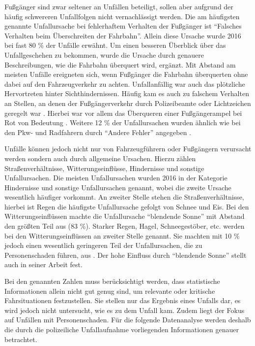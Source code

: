 Fußgänger sind zwar seltener an Unfällen beteiligt, sollen aber aufgrund der häufig schwereren Unfallfolgen nicht vernachlässigt werden. Die am häufigsten genannte Unfallursache bei fehlerhaftem Verhalten der Fußgänger ist \enquote{Falsches Verhalten beim Überschreiten der Fahrbahn}. Allein diese Ursache wurde 2016 bei fast 80 \% der Unfälle erwähnt. Um einen besseren Überblick über das Unfallgeschehen zu bekommen, wurde die Ursache durch genauere Beschreibungen, wie die Fahrbahn überquert wird, ergänzt. Mit Abstand am meisten Unfälle ereigneten sich, wenn Fußgänger die Fahrbahn überquerten ohne dabei auf den Fahrzeugverkehr zu achten. Unfallanfällig war auch das plötzliche Hervortreten hinter Sichthindernissen. Häufig kam es auch zu falschem Verhalten an Stellen, an denen der Fußgängerverkehr durch Polizeibeamte oder Lichtzeichen geregelt war \parencite[S. 304]{StatistischesBundesamt.2018b}. Hierbei war vor allem das Überqueren einer Fußgängerampel bei Rot von Bedeutung \parencite[S. 222]{Schreiber.2014}.
Weitere 12 \% der Unfallursachen wurden ähnlich wie bei den Pkw- und Radfahrern durch \enquote{Andere Fehler} angegeben \parencite[S. 304]{StatistischesBundesamt.2018b}.

Unfälle können jedoch nicht nur von Fahrzeugführern oder Fußgängern verursacht werden sondern auch durch allgemeine Ursachen. Hierzu zählen Straßenverhältnisse, Witterungseinflüsse, Hindernisse und sonstige Unfallursachen. Die meisten Unfallursachen wurden 2016 in der Kategorie Hindernisse und sonstige Unfallursachen genannt, wobei die zweite Ursache wesentlich häufiger vorkommt. An zweiter Stelle stehen die Straßenverhältnisse, hierbei ist Regen die häufigste Unfallursache gefolgt von Schnee und Eis. Bei den Witterungseinflüssen machte die Unfallursache \enquote{blendende Sonne} mit Abstand den größten Teil aus (83 \%). Starker Regen, Hagel, Schneegestöber, etc. werden bei den Witterungseinflüssen an zweiter Stelle genannt. Sie machten mit 10 \% jedoch einen wesentlich geringeren Teil der Unfallursachen, die zu Personenschaden führen, aus \parencite[S. 305]{StatistischesBundesamt.2018b}. Der hohe Einfluss durch \enquote{blendende Sonne} stellt auch \Textcite[S. 151]{Grundl.2005} in seiner Arbeit fest.%

Bei den genannten Zahlen muss berücksichtigt werden, dass statistische Informationen allein nicht gut genug sind, um relevante oder kritische Fahrsituationen festzustellen. Sie stellen nur das Ergebnis eines Unfalls dar, es wird jedoch nicht untersucht, wie es zu dem Unfall kam. Zudem liegt der Fokus auf Unfällen mit Personenschaden. Für die folgende Datenanalyse werden deshalb die durch die polizeiliche Unfallaufnahme vorliegenden Informationen genauer betrachtet.

